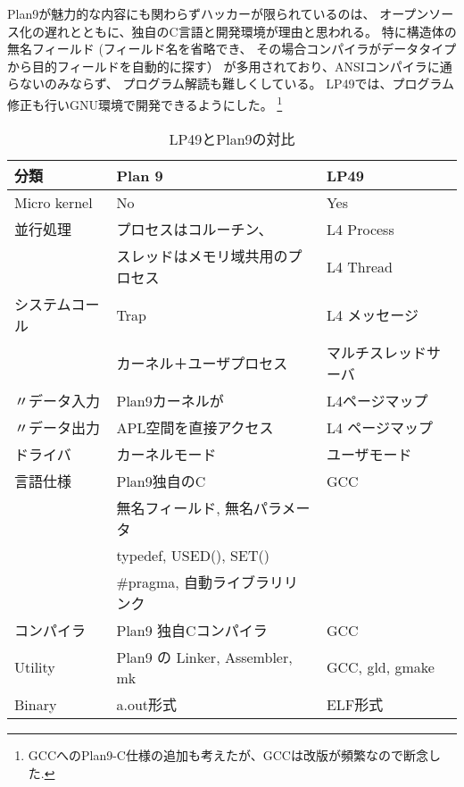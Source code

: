 \documentclass{ipsjpapers}
\begin{document}
Plan9が魅力的な内容にも関わらずハッカーが限られているのは、
オープンソース化の遅れとともに、独自のC言語と開発環境が理由と思われる。
特に構造体の無名フィールド (フィールド名を省略でき、
その場合コンパイラがデータタイプから目的フィールドを自動的に探す）
が多用されており、ANSIコンパイラに通らないのみならず、
プログラム解読も難しくしている。
LP49では、プログラム修正も行いGNU環境で開発できるようにした。
\footnote{GCCへのPlan9-C仕様の追加も考えたが、GCCは改版が頻繁なので断念した.}


\begin{table}[htb]
\caption[Plan9vsLP40]{LP49とPlan9の対比 }
\label{table:LP49-Plan9}
\begin{center}
{\footnotesize 
\begin{tabular}{|l|l|l|}
\hline
 分類  & Plan 9 & LP49 \\
\hline

Micro kernel  &     No        &   Yes   \\
\hline

並行処理  &  プロセスはコルーチン、 &   L4 Process  \\
          &  スレッドはメモリ域共用のプロセス &  L4 Thread \\
\hline

システムコール    & Trap       &     L4 メッセージ \\
                  & カーネル＋ユーザプロセス    & マルチスレッドサーバ \\
\hline

〃データ入力      & Plan9カーネルが   & L4ページマップ \\
〃データ出力      & APL空間を直接アクセス          & L4 ページマップ \\
\hline

ドライバ     & カーネルモード    & ユーザモード  \\
\hline

言語仕様 &  Plan9独自のC                     &   GCC    \\
         &  無名フィールド, 無名パラメータ   & \\
         &  typedef, USED(), SET()           &    \\
         &   \#pragma, 自動ライブラリリンク  & \\
\hline

コンパイラ  &   Plan9 独自Cコンパイラ   &   GCC \\
\hline

 Utility  &  Plan9 の Linker, Assembler, mk    & GCC, gld, gmake \\
\hline

Binary    &  a.out形式         &    ELF形式 \\
\hline

\end{tabular}
}
\end{center}
\end{table}
\end{document}
